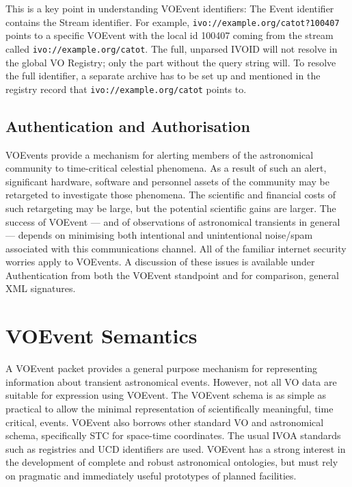 \documentclass[11pt,a4paper]{ivoa}
\begin{document}
This is a key point in understanding VOEvent identifiers: The Event
identifier contains the Stream identifier.  For example,
\nolinkurl{ivo://example.org/catot?100407}
points to a specific VOEvent with the local id 100407
coming from the stream called \nolinkurl{ivo://example.org/catot}.
The full, unparsed
IVOID will not resolve in
the global VO Registry; only the part without the query string will.
To resolve the full identifier, a separate archive has to be set up and
mentioned in the registry record that
\nolinkurl{ivo://example.org/catot} points to.

\subsection{Authentication and Authorisation}
\label{sec:2.3}
VOEvents provide a mechanism for alerting members of the astronomical community
to time-critical celestial phenomena. As a result of such an alert, significant
hardware, software and personnel assets of the community may be retargeted to
investigate those phenomena. The scientific and financial costs of such
retargeting may be large, but the potential scientific gains are larger. The
success of VOEvent --- and of observations of astronomical transients in general
--- depends on minimising both intentional and unintentional noise/spam
associated with this communications channel. All of the familiar internet
security worries apply to VOEvents. A discussion of these issues is available
under Authentication \citep{bib34} from both the VOEvent standpoint and for
comparison, general XML signatures.

\section{VOEvent Semantics}
\label{sec:3}
A VOEvent packet provides a general purpose mechanism for representing
information about transient astronomical events. However, not all VO data are
suitable for expression using VOEvent. The VOEvent schema
\citep{2011ivoa.spec.0711S} is as simple as practical to allow the minimal
representation of scientifically meaningful, time critical, events. VOEvent
also borrows other standard VO and astronomical schema, specifically STC for
space-time coordinates. The usual IVOA standards such as registries and UCD
identifiers are used. VOEvent has a strong interest in the development of
complete and robust astronomical ontologies, but must rely on pragmatic and
immediately useful prototypes of planned facilities.
\end{document}
